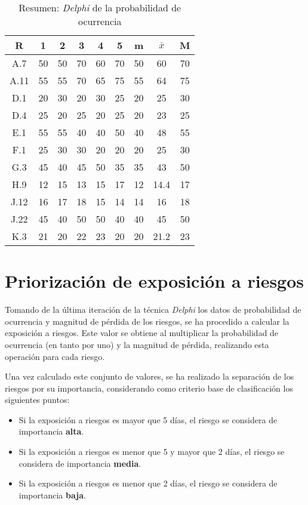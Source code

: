 \documentclass[11pt,a4paper,spanish,twoside]{book}
\begin{document}
\begin{table}[!h]
  \centering
  \begin{tabular}{|c||c|c|c|c|c||c|c|c|}
    \hline
    \textbf{R} & \textbf{1} & \textbf{2} & \textbf{3} & \textbf{4} &
    \textbf{5} & \textbf{m} &\textbf{$\bar{x}$} &\textbf{M} \\
    \hline \hline
    A.7  & 50 & 50 & 70 & 60 & 70 & 50 & 60   & 70 \\ \hline
    A.11 & 55 & 55 & 70 & 65 & 75 & 55 & 64   & 75 \\ \hline
    D.1  & 20 & 30 & 20 & 30 & 25 & 20 & 25   & 30 \\ \hline
    D.4  & 25 & 20 & 25 & 20 & 25 & 20 & 23   & 25 \\ \hline
    E.1  & 55 & 55 & 40 & 40 & 50 & 40 & 48   & 55 \\ \hline
    F.1  & 25 & 30 & 30 & 20 & 20 & 20 & 25   & 30 \\ \hline
    G.3  & 45 & 40 & 45 & 50 & 35 & 35 & 43   & 50 \\ \hline
    H.9  & 12 & 15 & 13 & 15 & 17 & 12 & 14.4 & 17 \\ \hline
    J.12 & 16 & 17 & 18 & 15 & 14 & 14 & 16   & 18 \\ \hline
    J.22 & 45 & 40 & 50 & 50 & 40 & 40 & 45   & 50 \\ \hline
    K.3  & 21 & 20 & 22 & 23 & 20 & 20 & 21.2 & 23 \\ \hline
  \end{tabular}
  \caption{Resumen: \emph{Delphi} de la probabilidad de ocurrencia}
\label{Tab:ResDELPHIpro}
\end{table}

\chapter{Priorización de exposición a riesgos}
Tomando de la última iteración de la técnica \emph{Delphi} los datos de
probabilidad de ocurrencia y magnitud de pérdida de los riesgos, se ha
procedido a calcular la exposición a riesgos. Este valor se obtiene al
multiplicar la probabilidad de ocurrencia (en tanto por uno) y la magnitud de
pérdida, realizando esta operación para cada riesgo.

Una vez calculado este conjunto de valores, se ha realizado la separación de
los riesgos por su importancia, considerando como criterio base de
clasificación los siguientes puntos:
\begin{itemize}
\item Si la exposición a riesgos es mayor que 5 días, el riesgo se considera de
  importancia \textbf{alta}.
\item Si la exposición a riesgos es menor que 5 y mayor que 2 días, el riesgo se
  considera de importancia \textbf{media}.
\item Si la exposición a riesgos es menor que 2 días, el riesgo se considera
  de importancia \textbf{baja}.
\end{itemize}
\end{document}
